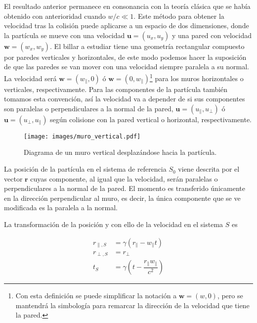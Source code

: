 El resultado anterior permanece en consonancia con la teoría clásica que se había obtenido con anterioridad cuando \( w/c \ll 1 \). Este método para obtener la velocidad tras la colisión puede aplicarse a un espacio de dos dimensiones, donde la partícula se mueve con una velocidad \( \mathbf{u} = (u_x, u_y) \) y una pared con velocidad \( \mathbf{w} = (w_x, w_y) \). El billar a estudiar tiene una geometría rectangular compuesto por paredes verticales y horizontales, de este modo podemos hacer la suposición de que las paredes se van mover con una velocidad siempre paralela a su normal. La velocidad será \( \mathbf{w} = (w_\parallel, 0) \) ó \( \mathbf{w} = (0, w_\parallel) \)\footnote{Con esta definición se puede simplificar la notación a \( \mathbf{w} = (w, 0) \), pero se mantendrá la simbología para remarcar la dirección de la velocidad que tiene la pared.} para los muros horizontales o verticales, respectivamente. Para las componentes de la partícula también tomamos esta convención, así la velocidad va a depender de si sus componentes son paralelas o perpendiculares a la normal de la pared, \( \mathbf{u} = (u_\parallel, u_\perp) \) ó \( \mathbf{u} = (u_\perp, u_\parallel) \) según colisione con la pared vertical o horizontal, respectivamente.

\begin{figure}[H]
    \centering
    \texttt{[image: images/muro\_vertical.pdf]}
    \caption{Diagrama de un muro vertical desplazándose hacia la partícula.}
    \label{fig:muro_vertical}
\end{figure}

La posición de la partícula en el sistema de referencia \( S_0 \) viene descrita por el vector \( \mathbf{r} \) cuyas componente, al igual que la velocidad, serán paralelas o perpendiculares a la normal de la pared. El momento es transferido únicamente en la dirección perpendicular al muro, es decir, la única componente que se ve modificada es la paralela a la normal. 


\vspace{3mm}

La transformación de la posición y con ello de la velocidad en el sistema \( S \) es

\begin{align}\label{eq:transformacion_2d}
    r_{\parallel,S} &= \gamma\left( r_\parallel - w_\parallel t \right) \nonumber\\
    r_{\perp, S} &= r_\perp  \\
    t_S &= \gamma\left( t - \dfrac{r_\parallel w_\parallel}{c^2} \right) \nonumber
\end{align}

